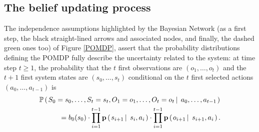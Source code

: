 \subsection{The belief updating process}
\label{thebeliefprocess}
The independence assumptions highlighted by the Bayesian Network 
(as a first step, the black straight-lined arrows and associated nodes,
and finally, the dashed green ones too)
of Figure \ref{POMDP}, assert that the probability distributions
defining the POMDP fully describe the uncertainty related to the system:
at time step $t \geqslant 1$, the probability that the $t$ first observations
are $(o_1,\ldots,o_t)$ and the $t+1$ first system states are $(s_0,\ldots,s_t)$
conditional on the $t$ first selected actions $(a_0, \ldots, a_{t-1})$ is
\begin{align*} 
&\mathbb{P} \left( \left.  S_0 = s_0, \ldots, S_t = s_t, O_1=o_1, \ldots,O_t = o_t \, \right| \left. \, a_0, \ldots, a_{t-1}  \right. \right) \\
& \hspace{1cm} = b_0(s_0) \cdot \prod_{i=1}^{t-1} \textbf{p} \left( \left.  s_{i+1} \, \right| \left. \, s_i, a_i  \right. \right) \cdot \prod_{i=1}^{t-1} \textbf{p} \left( \left.  o_{i+1} \, \right| \left. \, s_{i+1}, a_i  \right. \right).
\end{align*}

